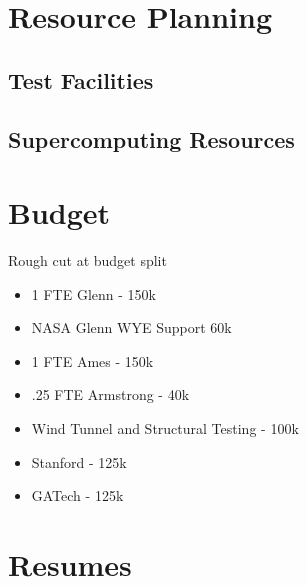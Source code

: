 \documentclass[]{aiaa-tc}
\begin{document}
  \section{Resource Planning}
    \subsection{Test Facilities}
    \subsection{Supercomputing Resources}

  \appendix

  \section{Budget}
    Rough cut at budget split
    \begin{itemize}
        \item 1 FTE Glenn - 150k 
        \item NASA Glenn WYE Support 60k 
        \item 1 FTE Ames - 150k 
        \item .25 FTE Armstrong - 40k
        \item Wind Tunnel and Structural Testing - 100k 
        \item Stanford - 125k 
        \item GATech - 125k
    \end{itemize}

  \section{Resumes}


  
\end{document}
